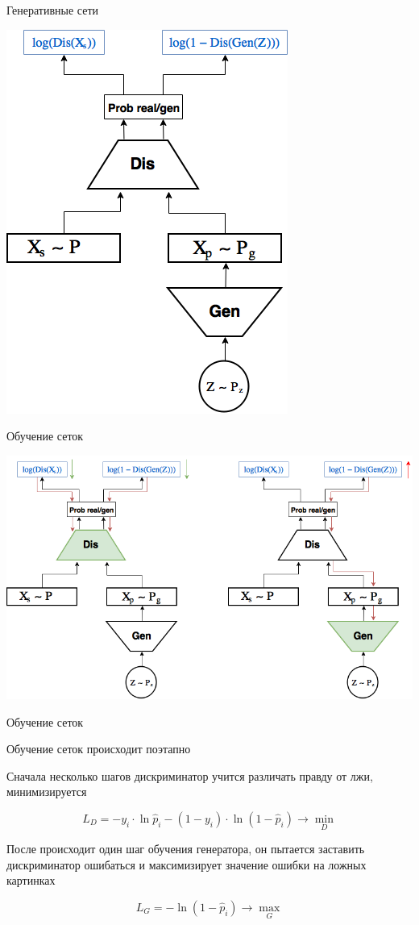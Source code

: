 \documentclass[notes,12pt, aspectratio=169]{beamer}
\newenvironment{wideitemize}{\itemize\addtolength{\itemsep}{10pt}}{\enditemize}
\begin{document}
\begin{frame}{Генеративные сети}
\begin{center}
	\includegraphics[width=.35\linewidth]{gan_1.png}
\end{center}
\end{frame}


\begin{frame}{Обучение сеток}
\begin{center}
	\includegraphics[width=.8\linewidth]{gan_2.png}
\end{center}
\end{frame}


\begin{frame}{Обучение сеток}
\begin{wideitemize}
	\item   Обучение сеток происходит поэтапно 
	\item   Сначала несколько шагов дискриминатор учится различать правду от лжи, минимизируется  
	
	\[ L_D =  - y_i \cdot \ln \hat p_i - (1 - y_i) \cdot \ln (1 - \hat p_i)  \to \min_{D} \]  \pause 
	
	\item   После происходит один шаг обучения генератора, он пытается заставить дискриминатор ошибаться и максимизирует значение ошибки на ложных картинках
	
	\[ 
	L_G = - \ln (1 - \hat p_i)  \to \max_{G}
	\]
\end{wideitemize}
\end{frame}
\end{document}
